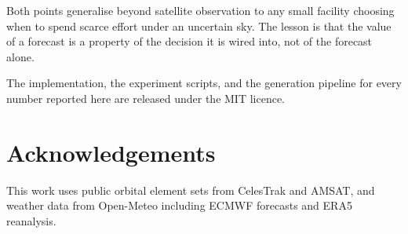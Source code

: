 \documentclass[conference]{IEEEtran}
\begin{document}
Both points generalise beyond satellite observation to any small facility
choosing when to spend scarce effort under an uncertain sky. The lesson is that
the value of a forecast is a property of the decision it is wired into, not of
the forecast alone.

The implementation, the experiment scripts, and the generation pipeline for every
number reported here are released under the MIT licence.

\section*{Acknowledgements}
This work uses public orbital element sets from CelesTrak and AMSAT, and weather
data from Open-Meteo including ECMWF forecasts and ERA5 reanalysis.



\end{document}
